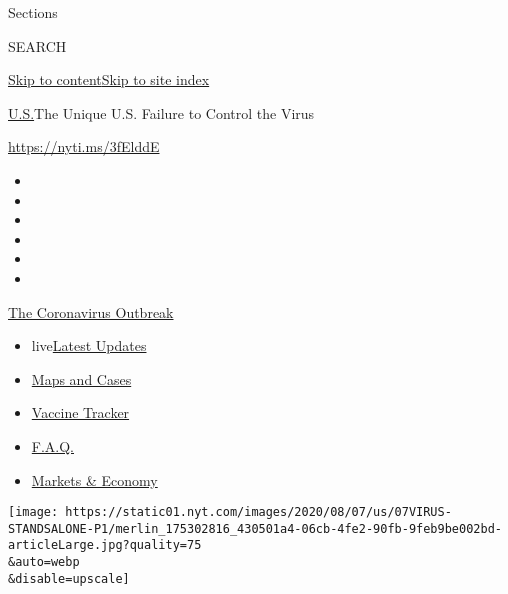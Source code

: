Sections

SEARCH

\protect\hyperlink{site-content}{Skip to
content}\protect\hyperlink{site-index}{Skip to site index}

\href{/section/us}{U.S.}\textbar{}The Unique U.S. Failure to Control the
Virus

\href{https://nyti.ms/3fElddE}{https://nyti.ms/3fElddE}

\begin{itemize}
\item
\item
\item
\item
\item
\item
\end{itemize}

\href{https://www.nytimes.com/news-event/coronavirus?action=click\&pgtype=Article\&state=default\&region=TOP_BANNER\&context=storylines_menu}{The
Coronavirus Outbreak}

\begin{itemize}
\tightlist
\item
  live\href{https://www.nytimes.com/2020/08/08/world/coronavirus-updates.html?action=click\&pgtype=Article\&state=default\&region=TOP_BANNER\&context=storylines_menu}{Latest
  Updates}
\item
  \href{https://www.nytimes.com/interactive/2020/us/coronavirus-us-cases.html?action=click\&pgtype=Article\&state=default\&region=TOP_BANNER\&context=storylines_menu}{Maps
  and Cases}
\item
  \href{https://www.nytimes.com/interactive/2020/science/coronavirus-vaccine-tracker.html?action=click\&pgtype=Article\&state=default\&region=TOP_BANNER\&context=storylines_menu}{Vaccine
  Tracker}
\item
  \href{https://www.nytimes.com/interactive/2020/world/coronavirus-tips-advice.html?action=click\&pgtype=Article\&state=default\&region=TOP_BANNER\&context=storylines_menu}{F.A.Q.}
\item
  \href{https://www.nytimes.com/live/2020/08/07/business/stock-market-today-coronavirus?action=click\&pgtype=Article\&state=default\&region=TOP_BANNER\&context=storylines_menu}{Markets
  \& Economy}
\end{itemize}

\texttt{[image: https://static01.nyt.com/images/2020/08/07/us/07VIRUS-STANDSALONE-P1/merlin\_175302816\_430501a4-06cb-4fe2-90fb-9feb9be002bd-articleLarge.jpg?quality=75\\\&auto=webp\\\&disable=upscale]}

